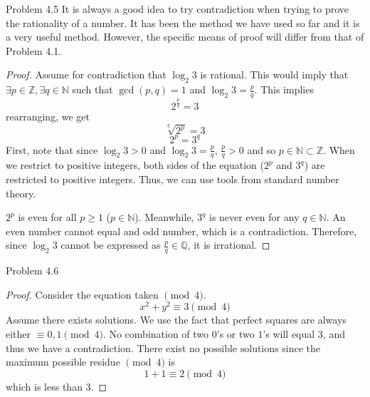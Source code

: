 \begin{sol}{Problem 4.5}
It is always a good idea to try contradiction when trying to prove the rationality of a number. It has been the method we have used so far and it is a very useful method. However, the specific means of proof will differ from that of Problem 4.1.
\begin{proof}
Assume for contradiction that $\log_{2}{3}$ is rational. This would imply that $\exists p \in \mathbb{Z}, \exists q \in \mathbb{N}$ such that $\gcd(p, q) = 1$ and $\log_{2}{3} = \frac{p}{q}$. This implies
\[
2^{\frac{p}{q}} = 3
\]
rearranging, we get
\[
\sqrt[q]{2^p} = 3
\]
\[
2^p = 3^q
\]
First, note that since $\log_{2}{3} > 0$ and $\log_{2}{3} = \frac{p}{q}$, $\frac{p}{q} > 0$ and so $p \in \mathbb{N} \subset \mathbb{Z}$. When we restrict to positive integers, both sides of the equation ($2^p$ and $3^q$) are restricted to positive integers. Thus, we can use tools from standard number theory. 

$2^p$ is even for all $p \geq 1$ ($p \in \mathbb{N}$). Meanwhile, $3^q$ is never even for any $q \in \mathbb{N}$. An even number cannot equal and odd number, which is a contradiction. Therefore, since $\log_{2}{3}$ cannot be expressed as $\frac{p}{q} \in \mathbb{Q}$, it is irrational. 
\end{proof}
\end{sol}

\begin{sol}{Problem 4.6}
\begin{proof}
Consider the equation taken $\pmod{4}$. 
\[
x^2 + y^2 \equiv 3 \pmod{4}
\]
Assume there exists solutions. We use the fact that perfect squares are always either $\equiv 0, 1 \pmod{4}$. No combination of two $0$'s or two $1$'s will equal $3$, and thus we have a contradiction. There exist $\boxed{\text{no possible solutions}}$ since the maximum possible residue $\pmod{4}$ is 
\[
1 + 1 \equiv 2 \pmod{4}
\]
which is less than 3.
\end{proof}
\end{sol}

